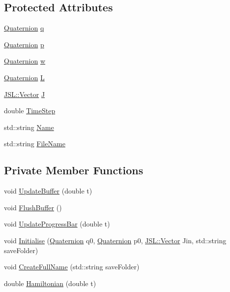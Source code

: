 \subsection*{Protected Attributes}
\begin{DoxyCompactItemize}
\item 
\hyperlink{classQDynamics_1_1Quaternion}{Quaternion} \hyperlink{classQDynamics_1_1Integrator_a5929511da076c7f31749a6da713fcff6}{q}
\item 
\hyperlink{classQDynamics_1_1Quaternion}{Quaternion} \hyperlink{classQDynamics_1_1Integrator_a1fb07254408f6ad620eb9dbfa0f8da95}{p}
\item 
\hyperlink{classQDynamics_1_1Quaternion}{Quaternion} \hyperlink{classQDynamics_1_1Integrator_a0241b2e2c87418323330999d1f8e12d0}{w}
\item 
\hyperlink{classQDynamics_1_1Quaternion}{Quaternion} \hyperlink{classQDynamics_1_1Integrator_adb45dae4f4d1d37ab83ca5269f51058d}{L}
\item 
\hyperlink{classJSL_1_1Vector}{J\+S\+L\+::\+Vector} \hyperlink{classQDynamics_1_1Integrator_a7b99b22475321b34c1624bded3489954}{J}
\item 
double \hyperlink{classQDynamics_1_1Integrator_a9b850dd4b29118e44b0183409db0a983}{Time\+Step}
\item 
std\+::string \hyperlink{classQDynamics_1_1Integrator_aa3e27d68428619ab4083b2d42ef8924c}{Name}
\item 
std\+::string \hyperlink{classQDynamics_1_1Integrator_a19ed0b9864ebe762914cee04cb0ad4b3}{File\+Name}
\end{DoxyCompactItemize}
\subsection*{Private Member Functions}
\begin{DoxyCompactItemize}
\item 
void \hyperlink{classQDynamics_1_1Integrator_af613a42e489de2d041673fd5be0ebb61}{Update\+Buffer} (double t)
\item 
void \hyperlink{classQDynamics_1_1Integrator_a571bd4098f5d245bf46cf7683dcc554a}{Flush\+Buffer} ()
\item 
void \hyperlink{classQDynamics_1_1Integrator_a88dc286b39899bdec60c040427d663cc}{Update\+Progress\+Bar} (double t)
\item 
void \hyperlink{classQDynamics_1_1Integrator_aa1afd442ef37708fcadb45ca8e7958f5}{Initialise} (\hyperlink{classQDynamics_1_1Quaternion}{Quaternion} q0, \hyperlink{classQDynamics_1_1Quaternion}{Quaternion} p0, \hyperlink{classJSL_1_1Vector}{J\+S\+L\+::\+Vector} Jin, std\+::string save\+Folder)
\item 
void \hyperlink{classQDynamics_1_1Integrator_ae80ab509b96a9b996934d9ef127f5137}{Create\+Full\+Name} (std\+::string save\+Folder)
\item 
double \hyperlink{classQDynamics_1_1Integrator_a816743f6efb41b0b29243ff3bdaa4c9d}{Hamiltonian} (double t)
\end{DoxyCompactItemize}
